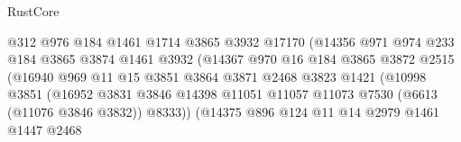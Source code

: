 \begin{lexlean}{RustCore}
\begin{coremodule}
                                    @312
                                    @976
                                    @184
                                    @1461
                                    @1714
                                    @3865
                                    @3932
                                    @17170
                                    (@14356
                                      @971
                                      @974
                                      @233
                                      @184
                                      @3865
                                      @3874
                                      @1461
                                      @3932
                                      (@14367
                                        @970
                                        @16
                                        @184
                                        @3865
                                        @3872
                                        @2515
                                        (@16940
                                          @969
                                          @11
                                          @15
                                          @3851
                                          @3864
                                          @3871
                                          @2468
                                          @3823
                                          @1421
                                          (@10998
                                            @3851
                                            (@16952
                                              @3831
                                              @3846
                                              @14398
                                              @11051
                                              @11057
                                              @11073
                                              @7530
                                              (@6613 (@11076 @3846 @3832))
                                              @8333))
                                          (@14375
                                            @896
                                            @124
                                            @11
                                            @14
                                            @2979
                                            @1461
                                            @1447
                                            @2468

\end{coremodule}
\end{lexlean}
